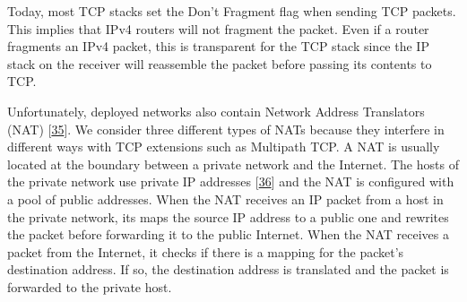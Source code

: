 \documentclass[letterpaper,10pt,english]{sphinxmanual}
\begin{document}
\sphinxAtStartPar
Today, most TCP stacks set the Don’t Fragment flag when sending TCP packets. This implies that IPv4 routers will not fragment the packet. Even if a router fragments an IPv4 packet, this is transparent for the TCP stack since the IP stack on the receiver will reassemble the packet before passing its contents to TCP.

\sphinxAtStartPar
Unfortunately, deployed networks also contain Network Address Translators (NAT) {[}\hyperlink{cite.biblio:id2952}{35}{]}. We consider three different types of NATs because they interfere in different ways with TCP extensions such as Multipath TCP. A NAT is usually located at the boundary between a private network and the Internet. The hosts of the private network use private IP addresses {[}\hyperlink{cite.biblio:id1848}{36}{]} and the NAT is configured with a pool of public addresses. When the NAT receives an IP packet from a host in the private network, its maps the source IP address to a public one and rewrites the packet before forwarding it to the public Internet. When the NAT receives a packet from the Internet, it checks if there is a mapping for the packet’s destination address. If so, the destination address is translated and the packet is forwarded to the private host.
\end{document}
